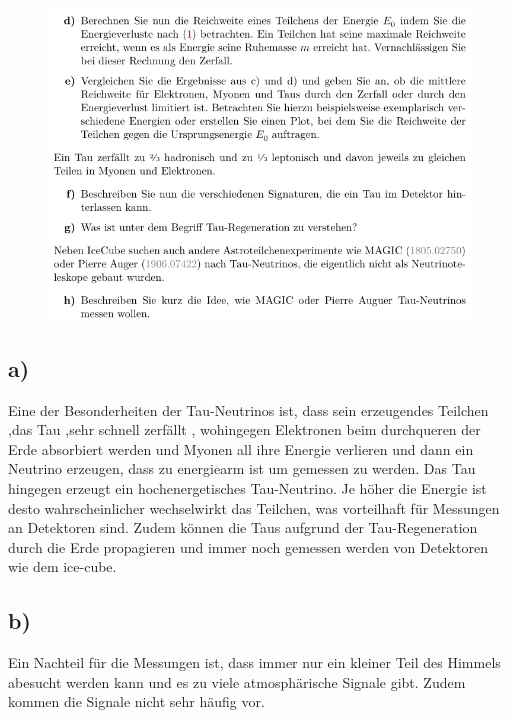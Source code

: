     \begin{figure}[H]
        \centering
        \includegraphics[width=\textwidth]{images/Aufgabe22b.jpg}
        \label{fig:2}
    \end{figure}

\subsection{a)}\justifying

    Eine der Besonderheiten der Tau-Neutrinos ist, dass sein erzeugendes Teilchen ,das Tau ,sehr schnell zerfällt
    , wohingegen Elektronen beim durchqueren der Erde absorbiert werden und Myonen all 
    ihre Energie verlieren und dann ein Neutrino erzeugen, dass zu energiearm ist um gemessen zu werden.
    Das Tau hingegen erzeugt ein hochenergetisches Tau-Neutrino. Je höher die Energie ist
    desto wahrscheinlicher wechselwirkt das Teilchen, was vorteilhaft für Messungen an
    Detektoren sind. Zudem können die Taus aufgrund der Tau-Regeneration durch die Erde propagieren
    und immer noch gemessen werden von Detektoren wie dem ice-cube.

\subsection{b)}
Ein Nachteil für die Messungen ist, dass immer nur ein kleiner Teil des Himmels
abesucht werden kann und es zu viele atmosphärische Signale gibt. Zudem kommen
die Signale nicht sehr häufig vor.

